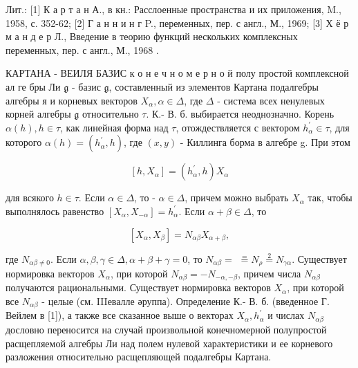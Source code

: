 \documentclass[10pt]{article}
\begin{document}
Лит.: [1] К а р т а н А., в кн.: Расслоенные пространства и их приложения, M., 1958, с. 352-62; [2] Г а н н и н г P., переменных, пер. с англ., М., 1969; [3] Х ё р м а н д е р Л., Введение в теорию функций нескольких комплексных переменных, пер. с англ., М., 1968 .



КАРТАНА - ВЕИЛЯ БАЗИС к о н е ч н о м е р н о й полу простой комплексной ал ге бры Ли $\mathfrak{g}$ - базис $\mathfrak{g}$, составленный из элементов Картана подалгебры алгебры я и корневых векторов $X_{\alpha}, \alpha \in \Delta$, где $\Delta$ - система всех ненулевых корней алгебры $\mathfrak{g}$ относительно $\tau$. К.- В. б. выбирается неоднозначно. Корень $\alpha(h), h \in \tau$, как линейная форма над $\tau$, отождествляется с вектором $h_{\alpha}^{\prime} \in \tau$, для которого $\alpha(h)=\left(h_{\alpha}^{\prime}, h\right)$, где $(x, y)$ - Киллинга борма в алгебре g. При этом



\[

\left[h, X_{\alpha}\right]=\left(h_{\alpha}^{\prime}, h\right) X_{\alpha}

\]



для всякого $h \in \tau$. Если $\alpha \in \Delta$, то - $\alpha \in \Delta$, причем можно выбрать $X_{\alpha}$ так, чтобы выполнялось равенство $\left[X_{\alpha}, X_{-\alpha}\right]=h_{\alpha}^{\prime}$. Если $\alpha+\beta \in \Delta$, то



\[

\left[X_{\alpha}, X_{\beta}\right]=N_{\alpha \beta} X_{\alpha+\beta},

\]



где $N_{\alpha \beta \neq 0}$. Если $\alpha, \beta, \gamma \in \Delta, \alpha+\beta+\gamma=0$, то $N_{\alpha \beta}=$ $\stackrel{=}{=} N_{\rho} \stackrel{2}{=} N_{\gamma \alpha}$. Существует нормировка векторов $X_{\alpha}$, при которой $N_{\alpha \beta}=-N_{-\alpha,-\beta}$, причем числа $N_{\alpha \beta}$ получаются рациональными. Существует нормировка векторов $X_{\alpha}$, при которой все $N_{\alpha \beta}$ - целые (см. IIIевалле әруппа). Определение К.- В. б. (введенное Г. Вейлем в [1]), а также все сказанное выше о векторах $X_{\alpha}, h_{\alpha}^{\prime}$ и числах $N_{\alpha \beta}$ дословно переносится на случай произвольной конечномерной полупростой расщепляемой алгебры Ли над полем нулевой характеристики и ее корневого разложения относительно расщепляющей подалгебры Картана.
\end{document}
